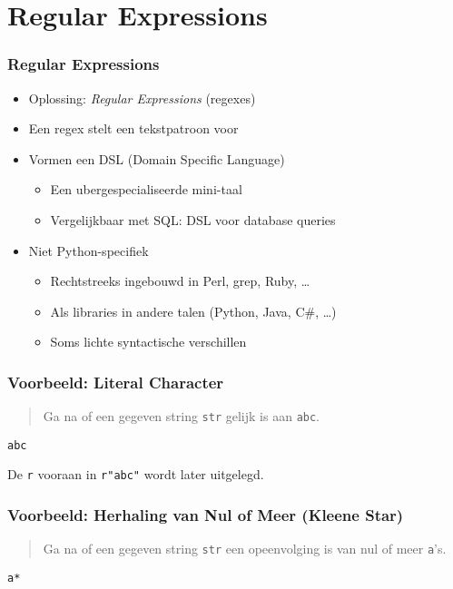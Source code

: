 \section{Regular Expressions}

\frame{\tableofcontents[currentsection]}

\begin{frame}
  \frametitle{Regular Expressions}
  \begin{itemize}
    \item Oplossing: \emph{Regular Expressions} (regexes) \vskip2mm
    \item Een regex stelt een tekstpatroon voor \vskip2mm
    \item Vormen een DSL (Domain Specific Language)
          \begin{itemize}
            \item Een ubergespecialiseerde mini-taal
            \item Vergelijkbaar met SQL: DSL voor database queries
          \end{itemize} \vskip2mm
    \item Niet Python-specifiek
          \begin{itemize}
            \item Rechtstreeks ingebouwd in Perl, grep, Ruby, \dots
            \item Als libraries in andere talen (Python, Java, C\#, \dots)
            \item Soms lichte syntactische verschillen
          \end{itemize}
  \end{itemize}
\end{frame}

\begin{frame}
  \frametitle{Voorbeeld: Literal Character}
  \begin{quote}
    Ga na of een gegeven string \texttt{str}
    gelijk is aan \texttt{abc}.
  \end{quote}
  \vskip2mm
  \begin{center}
    \texttt{abc}
  \end{center}
  \vskip2mm
  {\small De \texttt{r} vooraan in \texttt{r"abc"} wordt later uitgelegd.}
\end{frame}

\begin{frame}
  \frametitle{Voorbeeld: Herhaling van Nul of Meer (Kleene Star)}
  \begin{quote}
    Ga na of een gegeven string \texttt{str}
    een opeenvolging is van nul of meer \texttt{a}'s.
  \end{quote}
  \vskip2mm
  \begin{center}
    \texttt{a*}
  \end{center}
  \vskip2mm
  \vskip2mm
  \begin{matchexamples}
    \match{}
    \\[2mm]
  \end{matchexamples}
\end{frame}

